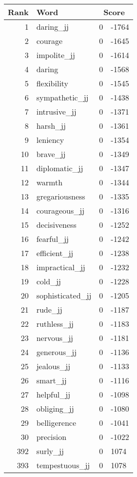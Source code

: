 \begin{longtable}[!htbp]{| rlr@{.}l |}
    \hline
    \textbf{Rank} & \textbf{Word} & \multicolumn{2}{c|}{\textbf{Score}} \\
    \hline
    \endhead
    1 & daring\_jj & 0 & -1764 \\
    2 & courage & 0 & -1645 \\
    3 & impolite\_jj & 0 & -1614 \\
    4 & daring & 0 & -1568 \\
    5 & flexibility & 0 & -1545 \\
    6 & sympathetic\_jj & 0 & -1438 \\
    7 & intrusive\_jj & 0 & -1371 \\
    8 & harsh\_jj & 0 & -1361 \\
    9 & leniency & 0 & -1354 \\
    10 & brave\_jj & 0 & -1349 \\
    11 & diplomatic\_jj & 0 & -1347 \\
    12 & warmth & 0 & -1344 \\
    13 & gregariousness & 0 & -1335 \\
    14 & courageous\_jj & 0 & -1316 \\
    15 & decisiveness & 0 & -1252 \\
    16 & fearful\_jj & 0 & -1242 \\
    17 & efficient\_jj & 0 & -1238 \\
    18 & impractical\_jj & 0 & -1232 \\
    19 & cold\_jj & 0 & -1228 \\
    20 & sophisticated\_jj & 0 & -1205 \\
    21 & rude\_jj & 0 & -1187 \\
    22 & ruthless\_jj & 0 & -1183 \\
    23 & nervous\_jj & 0 & -1181 \\
    24 & generous\_jj & 0 & -1136 \\
    25 & jealous\_jj & 0 & -1133 \\
    26 & smart\_jj & 0 & -1116 \\
    27 & helpful\_jj & 0 & -1098 \\
    28 & obliging\_jj & 0 & -1080 \\
    29 & belligerence & 0 & -1041 \\
    30 & precision & 0 & -1022 \\
    392 & surly\_jj & 0 & 1074 \\
    393 & tempestuous\_jj & 0 & 1078 \\

\end{longtable}
